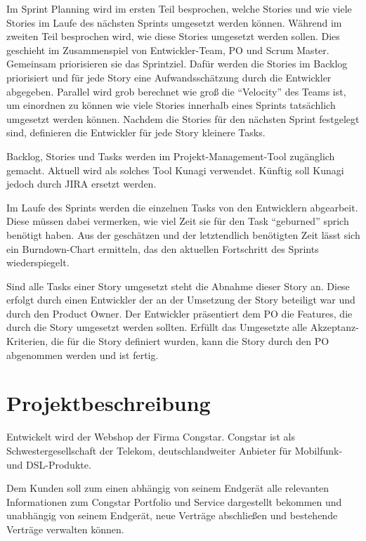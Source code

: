 \documentclass[11pt,a4paper]{article} %
\begin{document}
Im Sprint Planning wird im ersten Teil besprochen, welche Stories und wie viele Stories 
im Laufe des nächsten Sprints umgesetzt werden können. Während im zweiten Teil besprochen wird, 
wie diese Stories umgesetzt werden sollen.
Dies geschieht im Zusammenspiel von Entwickler-Team, PO und Scrum Master. Gemeinsam priorisieren sie das Sprintziel. 
Dafür werden die Stories im Backlog priorisiert und für jede Story eine Aufwandsschätzung durch die Entwickler abgegeben. 
Parallel wird grob berechnet wie groß die “Velocity” des Teams ist, um einordnen zu können wie viele Stories 
innerhalb eines Sprints tatsächlich umgesetzt werden können. Nachdem die Stories für den nächsten Sprint festgelegt sind, 
definieren die Entwickler für jede Story kleinere Tasks. 

Backlog, Stories und Tasks werden im Projekt-Management-Tool
zugänglich gemacht. Aktuell wird als solches Tool Kunagi verwendet. Künftig soll Kunagi jedoch durch JIRA ersetzt werden.  

Im Laufe des Sprints werden die einzelnen Tasks von den Entwicklern abgearbeit. Diese müssen dabei vermerken, 
wie viel Zeit sie für den Task “geburned” sprich benötigt haben. Aus der geschätzen und der letztendlich benötigten Zeit 
lässt sich ein Burndown-Chart ermitteln, das den aktuellen Fortschritt des Sprints wiederspiegelt.

Sind alle Tasks einer Story umgesetzt steht die Abnahme dieser Story an. Diese erfolgt 
durch einen Entwickler der an der Umsetzung der Story beteiligt war und durch den Product Owner. 
Der Entwickler präsentiert dem PO die Features, die durch die Story umgesetzt werden sollten. 
Erfüllt das Umgesetzte alle Akzeptanz-Kriterien, die für die Story definiert wurden, 
kann die Story durch den PO abgenommen werden und ist fertig.

\section{Projektbeschreibung} \label{sec:projekt}

Entwickelt wird der Webshop der Firma Congstar. Congstar ist als Schwestergesellschaft der Telekom, 
deutschlandweiter Anbieter für Mobilfunk- und DSL-Produkte. 

Dem Kunden soll zum einen abhängig von seinem Endgerät alle relevanten Informationen zum Congstar Portfolio und 
Service dargestellt bekommen und unabhängig von seinem Endgerät, 
neue Verträge abschließen und bestehende Verträge verwalten können. 
\end{document}
